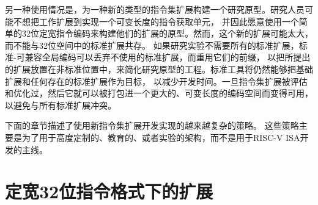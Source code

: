 另一种使用情况是，为一种新的类型的指令集扩展构建一个研究原型。研究人员可能不想把工作扩展到实现一个可变长度的指令获取单元，
并因此愿意使用一个简单的32位定宽指令编码来构建他们的扩展的原型。然而，这个新的扩展可能太大，而不能与32位空间中的标准扩展共存。
如果研究实验不需要所有的标准扩展，标准-可兼容全局编码可以丢弃不使用的标准扩展，而重用它们的前缀，
以把所提出的扩展放置在非标准位置中，来简化研究原型的工程。标准工具将仍然能够把基础扩展和任何存在的标准扩展作为目标，
以减少开发时间。一旦指令集扩展被评估和优化过，然后它就可以被打包进一个更大的、可变长度的编码空间而变得可用，
以避免与所有标准扩展冲突。

下面的章节描述了使用新指令集扩展开发实现的越来越复杂的策略。
这些策略主要是为了用于高度定制的、教育的、或者实验的架构，而不是用于RISC-V ISA开发的主线。

\section{定宽32位指令格式下的扩展}
\label{fix32b}

